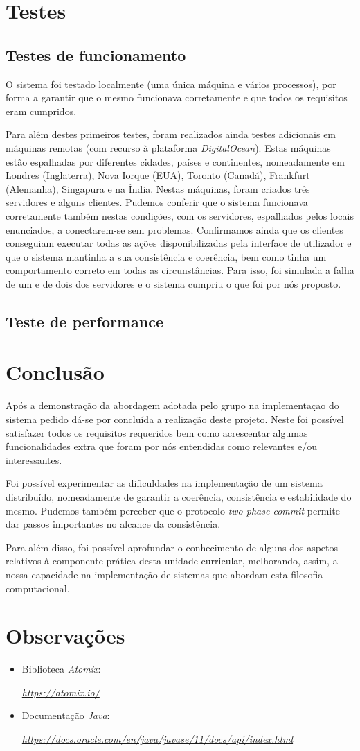 \documentclass[a4paper]{report}
\begin{document}
\chapter{Testes}
	\section{Testes de funcionamento}
		O sistema foi testado localmente (uma única máquina e vários processos), por forma a garantir que o mesmo funcionava corretamente e que todos os requisitos eram cumpridos.

		Para além destes primeiros testes, foram realizados ainda testes adicionais em máquinas remotas (com recurso à plataforma \textit{DigitalOcean}). Estas máquinas estão espalhadas por diferentes cidades, países e continentes, 
		nomeadamente em Londres (Inglaterra), Nova Iorque (EUA), Toronto (Canadá), Frankfurt (Alemanha), Singapura e na Índia.
		Nestas máquinas, foram criados três servidores e alguns clientes. 
		Pudemos conferir que o sistema funcionava corretamente também nestas condições, com os servidores, espalhados pelos locais enunciados, a conectarem-se sem problemas.
		Confirmamos ainda que os clientes conseguiam executar todas as ações disponibilizadas pela interface de utilizador e que o sistema mantinha a sua consistência e coerência, 
		bem como tinha um comportamento correto em todas as circunstâncias. Para isso, foi simulada a falha de um e de dois dos servidores e o sistema cumpriu o que foi por nós proposto.

	\section{Teste de performance} %

\chapter{Conclusão}
\large{
	Após a demonstração da abordagem adotada pelo grupo na implementaçao do sistema pedido dá-se por concluída a realização deste projeto. 
	Neste foi possível satisfazer todos os requisitos requeridos bem como acrescentar algumas funcionalidades extra que foram por nós entendidas como relevantes e/ou interessantes.

	Foi possível experimentar as dificuldades na implementação de um sistema distribuído, nomeadamente de garantir a coerência, consistência e estabilidade do mesmo.
	Pudemos também perceber que o protocolo \textit{two-phase commit} permite dar passos importantes no alcance da consistência.

	Para além disso, foi possível aprofundar o conhecimento de alguns dos aspetos relativos à componente prática desta unidade curricular, melhorando, assim, 
	a nossa capacidade na implementação de sistemas que abordam esta filosofia computacional.
}

\appendix
\chapter{Observações}
\begin{itemize}
	\item Biblioteca \textit{Atomix}:
	\par \textit{\url{https://atomix.io/}}
	\item Documentação \textit{Java}:
	\par \textit{\url{https://docs.oracle.com/en/java/javase/11/docs/api/index.html}}
\end{itemize}
\end{document}
